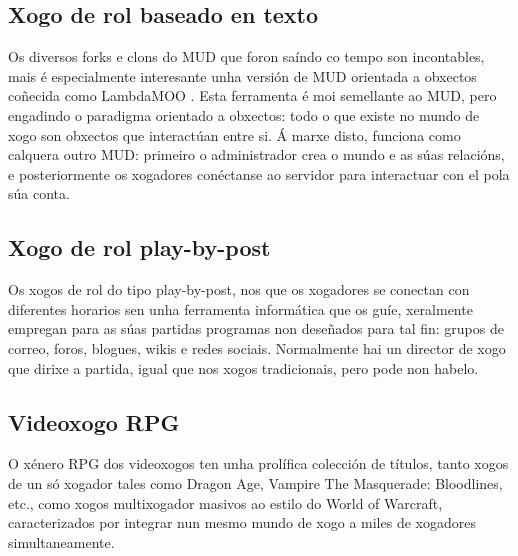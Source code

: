 \subsection{Xogo de rol baseado en texto}
Os diversos forks e clons do MUD que foron saíndo co tempo son incontables, mais
é especialmente interesante unha versión de MUD orientada a obxectos coñecida
como LambdaMOO \cite{lambdamoo}. Esta ferramenta é moi semellante ao MUD, pero
engadindo o paradigma orientado a obxectos: todo o que existe no mundo de xogo
son obxectos que interactúan entre si. Á marxe disto, funciona como calquera
outro MUD: primeiro o administrador crea o mundo e as súas relacións, e
posteriormente os xogadores conéctanse ao servidor para interactuar con el pola
súa conta.

\subsection{Xogo de rol play-by-post}
Os xogos de rol do tipo play-by-post, nos que os xogadores se conectan con
diferentes horarios sen unha ferramenta informática que os guíe, xeralmente
empregan para as súas partidas programas non deseñados para tal fin:
grupos de correo, foros, blogues, wikis e redes sociais. Normalmente hai un
director de xogo que dirixe a partida, igual que nos xogos tradicionais, pero
pode non habelo.

\subsection{Videoxogo RPG}
O xénero RPG dos videoxogos ten unha prolífica colección de títulos, tanto xogos
de un só xogador tales como Dragon Age, Vampire The Masquerade: Bloodlines,
etc., como xogos multixogador masivos ao estilo do World of Warcraft,
caracterizados por integrar nun mesmo mundo de xogo a miles de xogadores
simultaneamente.

